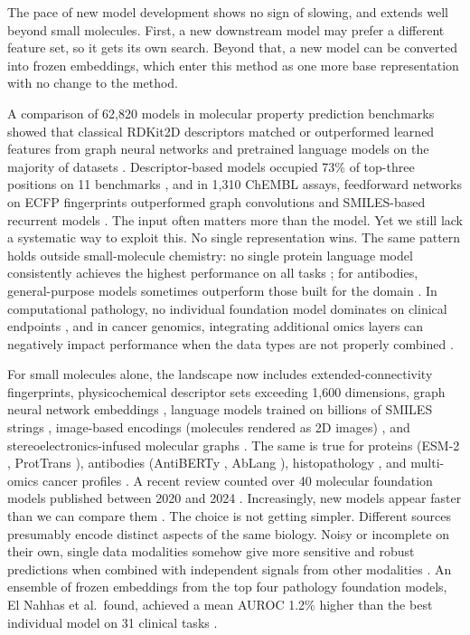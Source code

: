 The pace of new model development shows no sign of slowing, and extends well beyond small molecules. First, a new downstream model may prefer a different feature set, so it gets its own search. Beyond that, a new model can be converted into frozen embeddings, which enter this method as one more base representation with no change to the method.

A comparison of 62,820 models in molecular property prediction benchmarks showed that classical RDKit2D descriptors matched or outperformed learned features from graph neural networks and pretrained language models on the majority of datasets \citep{Deng2023}. Descriptor-based models occupied 73\% of top-three positions on 11 benchmarks \citep{Jiang2021}, and in 1,310 ChEMBL assays, feedforward networks on ECFP fingerprints outperformed graph convolutions and SMILES-based recurrent models \citep{Mayr2018}. The input often matters more than the model. Yet we still lack a systematic way to exploit this. No single representation wins. The same pattern holds outside small-molecule chemistry: no single protein language model consistently achieves the highest performance on all tasks \citep{Kenlay2024, Schmirler2024}; for antibodies, general-purpose models sometimes outperform those built for the domain \citep{Kenlay2024}. In computational pathology, no individual foundation model dominates on clinical endpoints \citep{ElNahhas2025}, and in cancer genomics, integrating additional omics layers can negatively impact performance when the data types are not properly combined \citep{Steyaert2023}.

For small molecules alone, the landscape now includes extended-connectivity fingerprints, physicochemical descriptor sets exceeding 1,600 dimensions, graph neural network embeddings \citep{Yang2019, Fang2022}, language models trained on billions of SMILES strings \citep{ross2022}, image-based encodings (molecules rendered as 2D images) \citep{Zeng2022}, and stereoelectronics-infused molecular graphs \citep{Boiko2025}. The same is true for proteins (ESM-2 \citep{Lin2023}, ProtTrans \citep{Elnaggar2022}), antibodies (AntiBERTy \citep{Ruffolo2021}, AbLang \citep{Olsen2022}), histopathology \citep{ElNahhas2025}, and multi-omics cancer profiles \citep{Steyaert2023}. A recent review counted over 40 molecular foundation models published between 2020 and 2024 \citep{Song2026}. Increasingly, new models appear faster than we can compare them \citep{Bommasani2021}. The choice is not getting simpler. Different sources presumably encode distinct aspects of the same biology. Noisy or incomplete on their own, single data modalities somehow give more sensitive and robust predictions when combined with independent signals from other modalities \citep{Steyaert2023}. An ensemble of frozen embeddings from the top four pathology foundation models, El Nahhas et al.\ found, achieved a mean AUROC 1.2\% higher than the best individual model on 31 clinical tasks \citep{ElNahhas2025}.

